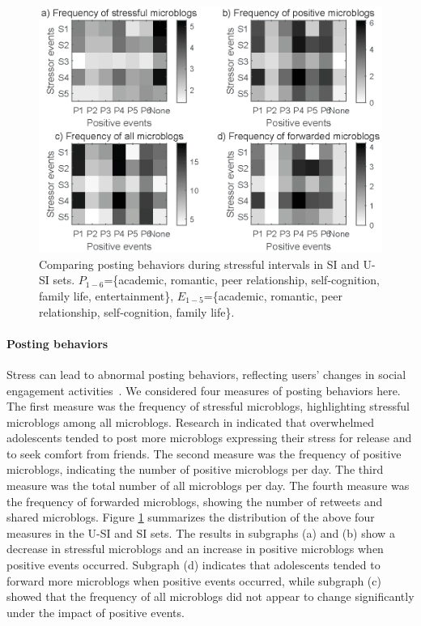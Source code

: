 \begin{figure}[h]
\centering
\includegraphics[width=\linewidth]{figs/gray/post.eps}
\caption{\small{Comparing posting behaviors during stressful intervals in SI and U-SI sets.
$P_{1-6}$=\{academic, romantic, peer relationship, self-cognition, family life, entertainment\},
$E_{1-5}$=\{academic, romantic, peer relationship, self-cognition, family life\}.}}
\label{fig:post}
\end{figure}

\paragraph{\textbf{Posting behaviors}}
Stress can lead to abnormal posting behaviors,
reflecting users' changes in social engagement activities~\citep{Liang2015Teenagers}. 
We considered four measures of posting behaviors here.
The first measure was the frequency of stressful microblogs,
highlighting stressful microblogs among all microblogs.
Research in \cite{Li2017Analyzing} indicated that overwhelmed adolescents
tended to post more microblogs expressing their stress for release and to seek comfort from friends.
The second measure was the frequency of positive microblogs,
indicating the number of positive microblogs per day.
The third measure was the total number of all microblogs per day.
The fourth measure was the frequency of forwarded microblogs,
showing the number of retweets and shared microblogs.
Figure \ref{fig:post} summarizes the distribution of the above four measures in the U-SI and SI sets.
The results in subgraphs (a) and (b) show a decrease in stressful microblogs and
an increase in positive microblogs when positive events occurred.
Subgraph (d) indicates that adolescents tended to forward more microblogs when positive events occurred, 
while subgraph (c) showed that the frequency of all microblogs did not appear to change significantly under the impact of positive events.

